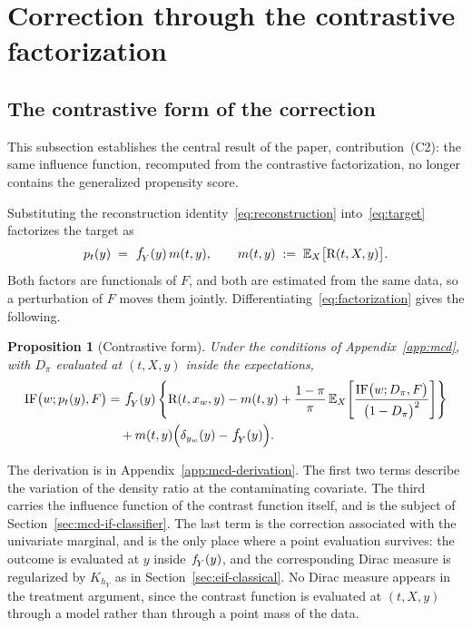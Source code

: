 \documentclass[11pt]{article}
\theoremstyle{plain}
\newtheorem{mypropo}{Proposition}
\theoremstyle{definition}
\theoremstyle{remark}
\newcommand{\pE}{\ensuremath{\mathbb{E}}}
\newcommand{\pf}[1]{\ensuremath{\,\mathlarger{\textit{f}}_{#1}}}
\newcommand{\ratio}{\ensuremath{\pi}}
\newcommand{\contrast}{D_{\ratio}}
\newcommand{\DensityRatio}{\text{R}}
\newcommand{\IF}{\mathrm{IF}}
\begin{document}
\section{Correction through the contrastive factorization}
\label{sec:mcd-correction}

\subsection{The contrastive form of the correction}
\label{sec:mcd-form}

This subsection establishes the central result of the paper, contribution~(C2): the same
influence function, recomputed from the contrastive factorization, no longer contains the
generalized propensity score.

Substituting the reconstruction identity~\eqref{eq:reconstruction}
into~\eqref{eq:target} factorizes the target as
\begin{equation}
p_t(y) \;=\; \pf{Y}(y)\,m(t,y),
\qquad
m(t,y) \;:=\; \pE_X\big[\DensityRatio(t,X,y)\big] .
\label{eq:factorization}
\end{equation}
Both factors are functionals of $F$, and both are estimated from the same data, so a
perturbation of $F$ moves them jointly. Differentiating~\eqref{eq:factorization} gives
the following.

\begin{mypropo}[Contrastive form]
\label{prop:if-mcd}
Under the conditions of Appendix~\ref{app:mcd}, with $\contrast$ evaluated at $(t,X,y)$
inside the expectations,
\begin{equation}
\begin{aligned}
\IF\big(w;p_t(y),F\big)
&= \pf{Y}(y)\left\{
\DensityRatio(t,x_w,y) - m(t,y)
+ \frac{1-\ratio}{\ratio}\,
\pE_X\!\left[ \frac{\IF\big(w;\contrast,F\big)}{\big(1-\contrast\big)^{2}} \right]
\right\} \\
&\quad + m(t,y)\Big( \delta_{y_w}(y) - \pf{Y}(y) \Big).
\end{aligned}
\label{eq:if-mcd}
\end{equation}
\end{mypropo}

The derivation is in Appendix~\ref{app:mcd-derivation}. The first two terms describe the
variation of the density ratio at the contaminating covariate. The third carries the
influence function of the contrast function itself, and is the subject of
Section~\ref{sec:mcd-if-classifier}. The last term is the correction associated with the
univariate marginal, and is the only place where a point evaluation survives: the outcome
is evaluated at $y$ inside $\pf{Y}(y)$, and the corresponding Dirac measure is
regularized by $K_{h_Y}$ as in Section~\ref{sec:eif-classical}. No Dirac measure appears
in the treatment argument, since the contrast function is evaluated at $(t,X,y)$ through a
model rather than through a point mass of the data.
\end{document}
